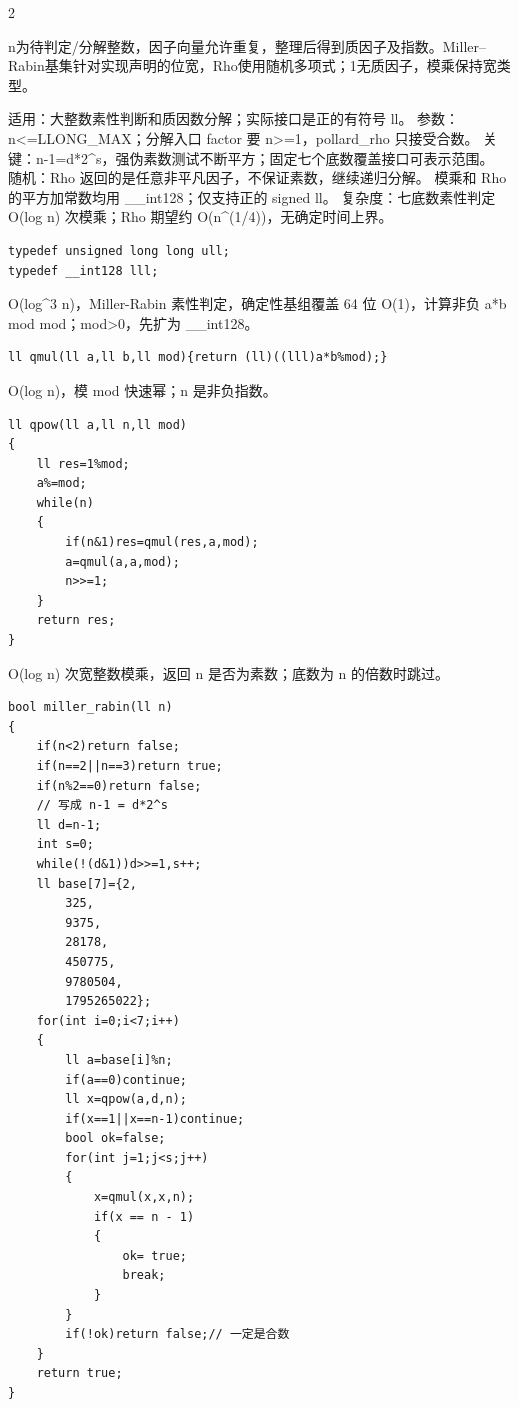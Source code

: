 \documentclass[UTF8,fontset=fandol,a4paper,twoside]{ctexart}
\newcommand{\note}[1]{{\fontsize{10}{12}\selectfont #1\par}}
\begin{document}
\begin{multicols}{2}
\note{n为待判定/\allowbreak{}分解整数，因子向量允许重复，整理后得到质因子及指数。Miller–Rabin基集针对实现声明的位宽，Rho使用随机多项式；1无质因子，模乘保持宽类型。}
\note{适用：大整数素性判断和质因数分解；实际接口是正的有符号 ll。 参数：n<\allowbreak{}=\allowbreak{}LLONG\_MAX；分解入口 factor 要 n>\allowbreak{}=\allowbreak{}1，pollard\_rho 只接受合数。 关键：n-\allowbreak{}1=\allowbreak{}d*2\textasciicircum{}s，强伪素数测试不断平方；固定七个底数覆盖接口可表示范围。 随机：Rho 返回的是任意非平凡因子，不保证素数，继续递归分解。 模乘和 Rho 的平方加常数均用 \_\_int128；仅支持正的 signed ll。 复杂度：七底数素性判定 O(\allowbreak{}log n)\allowbreak{} 次模乘；Rho 期望约 O(\allowbreak{}n\textasciicircum{}(\allowbreak{}1/\allowbreak{}4)\allowbreak{})\allowbreak{}，无确定时间上界。}
\begin{lstlisting}
typedef unsigned long long ull;
typedef __int128 lll;
\end{lstlisting}
\note{O(\allowbreak{}log\textasciicircum{}3 n)\allowbreak{}，Miller-\allowbreak{}Rabin 素性判定，确定性基组覆盖 64 位 O(\allowbreak{}1)\allowbreak{}，计算非负 a*b mod mod；mod>\allowbreak{}0，先扩为 \_\_int128。}
\begin{lstlisting}
ll qmul(ll a,ll b,ll mod){return (ll)((lll)a*b%mod);}
\end{lstlisting}
\note{O(\allowbreak{}log n)\allowbreak{}，模 mod 快速幂；n 是非负指数。}
\begin{lstlisting}
ll qpow(ll a,ll n,ll mod)
{
    ll res=1%mod;
    a%=mod;
    while(n)
    {
        if(n&1)res=qmul(res,a,mod);
        a=qmul(a,a,mod);
        n>>=1;
    }
    return res;
}
\end{lstlisting}
\note{O(\allowbreak{}log n)\allowbreak{} 次宽整数模乘，返回 n 是否为素数；底数为 n 的倍数时跳过。}
\begin{lstlisting}
bool miller_rabin(ll n)
{
    if(n<2)return false;
    if(n==2||n==3)return true;
    if(n%2==0)return false;
    // 写成 n-1 = d*2^s
    ll d=n-1;
    int s=0;
    while(!(d&1))d>>=1,s++;
    ll base[7]={2,
        325,
        9375,
        28178,
        450775,
        9780504,
        1795265022};
    for(int i=0;i<7;i++)
    {
        ll a=base[i]%n;
        if(a==0)continue;
        ll x=qpow(a,d,n);
        if(x==1||x==n-1)continue;
        bool ok=false;
        for(int j=1;j<s;j++)
        {
            x=qmul(x,x,n);
            if(x == n - 1)
            {
                ok= true;
                break;
            }
        }
        if(!ok)return false;// 一定是合数
    }
    return true;
}
\end{lstlisting}

\end{multicols}
\end{document}
